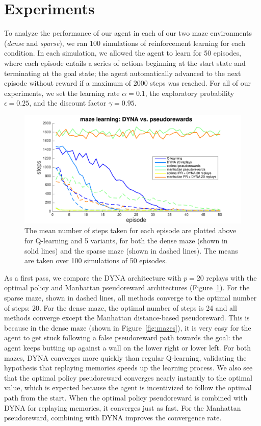 \documentclass[notitlepage]{article}
\begin{document}
\section*{Experiments}

To analyze the performance of our agent in each of our two maze environments (\textit{dense} and \textit{sparse}), we ran 100 simulations of reinforcement learning for each condition. In each simulation, we allowed the agent to learn for 50 episodes, where each episode entails a series of actions beginning at the start state and terminating at the goal state; the agent automatically advanced to the next episode without reward if a maximum of 2000 steps was reached. For all of our experiments, we set the learning rate $\alpha = 0.1$, the exploratory probability $\epsilon = 0.25$, and the discount factor $\gamma = 0.95$. 

\begin{figure}[ht]
\includegraphics[width=\textwidth]{modelCompareNoNoise}
\caption{The mean number of steps taken for each episode are plotted above for Q-learning and 5 variants, for both the dense maze (shown in solid lines) and the sparse maze (shown in dashed lines). The means are taken over 100 simulations of 50 episodes.}
\label{fig:model-compare}
\end{figure}

As a first pass, we compare the DYNA architecture with $p =20$ replays with the optimal policy and Manhattan pseudoreward architectures (Figure~\ref{fig:model-compare}). For the sparse maze, shown in dashed lines, all methods converge to the optimal number of steps: 20. For the dense maze, the optimal number of steps is 24 and all methods converge except the Manhattan distance-based pseudoreward. This is because in the dense maze (shown in Figure~\ref{fig:mazes}), it is very easy for the agent to get stuck following a false pseudoreward path towards the goal: the agent keeps butting up against a wall on the lower right or lower left. For both mazes, DYNA converges more quickly than regular Q-learning, validating the hypothesis that replaying memories speeds up the learning process. We also see that the optimal policy pseudoreward converges nearly instantly to the optimal value, which is expected because the agent is incentivized to follow the optimal path from the start. When the optimal policy pseudoreward is combined with DYNA for replaying memories, it converges just as fast. For the Manhattan pseudoreward, combining with DYNA improves the convergence rate. 
\end{document}
